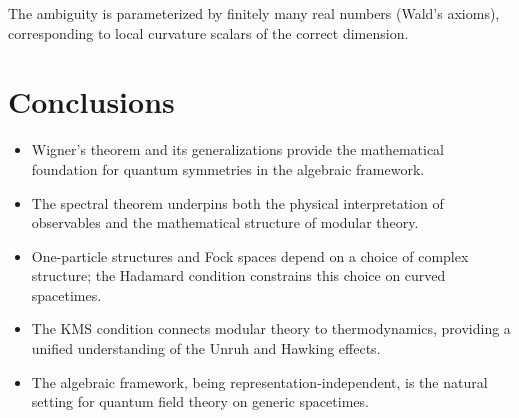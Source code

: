\documentclass[11pt,a4paper]{article}
\begin{document}
The ambiguity is parameterized by finitely many real numbers (Wald's axioms),
corresponding to local curvature scalars of the correct dimension.

\section{Conclusions}

\begin{itemize}[nosep]
  \item Wigner's theorem and its generalizations provide the mathematical
        foundation for quantum symmetries in the algebraic framework.
  \item The spectral theorem underpins both the physical interpretation
        of observables and the mathematical structure of modular theory.
  \item One-particle structures and Fock spaces depend on a choice of
        complex structure; the Hadamard condition constrains this choice
        on curved spacetimes.
  \item The KMS condition connects modular theory to thermodynamics,
        providing a unified understanding of the Unruh and Hawking effects.
  \item The algebraic framework, being representation-independent, is
        the natural setting for quantum field theory on generic spacetimes.
\end{itemize}
\end{document}
